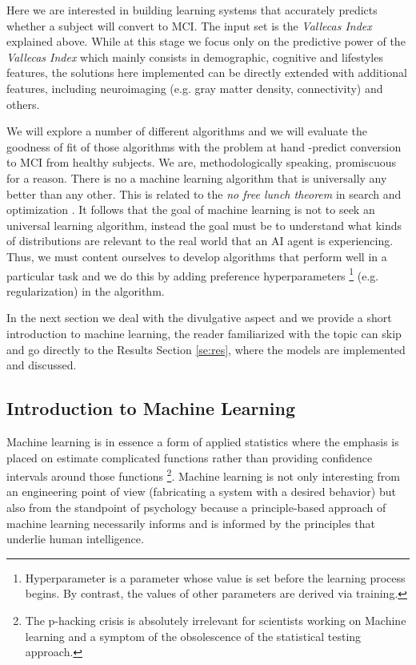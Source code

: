 \documentclass[11pt]{article}
\theoremstyle{definition}
\theoremstyle{remark}
\begin{document}
Here we are interested in building learning systems that accurately predicts whether a subject will convert to MCI. The input set is the \emph{Vallecas Index} explained above. While at this stage we focus only on the predictive power of the \emph{Vallecas Index} which mainly consists in demographic, cognitive and lifestyles features, the solutions here implemented can be directly extended with additional features, including neuroimaging (e.g. gray matter density, connectivity) and others.

We will explore a number of different algorithms and we will evaluate the goodness of fit of those algorithms with the problem at hand -predict conversion to MCI from healthy subjects. We are, methodologically speaking, promiscuous for a reason. There is no a machine learning algorithm that is universally any better than any other. This is related to the \emph{no free lunch theorem} in search and optimization \cite{wolpert1997no}. It follows that the goal of machine learning is not to seek an universal learning algorithm, instead the goal must be to understand what kinds of distributions are relevant to the real world that an AI agent is experiencing. Thus, we must content ourselves to develop algorithms that perform well in a particular task and we do this by adding preference hyperparameters \footnote{Hyperparameter is a parameter whose value is set before the learning process begins. By contrast, the values of other parameters are derived via training.} (e.g. regularization) in the algorithm.  

In the next section we deal with the divulgative aspect and we provide a short introduction to machine learning, the reader familiarized with the topic can skip and go directly to the Results Section \ref{se:res}, where the models are implemented and discussed. 

\subsection{Introduction to Machine Learning} 
\label{sse:iml}
Machine learning is in essence a form of applied statistics where the emphasis is placed on estimate complicated functions rather than providing confidence intervals around those functions \footnote{The p-hacking crisis is absolutely irrelevant for scientists working on Machine learning and a symptom of the obsolescence of the statistical testing approach.}. Machine learning is not only interesting from an engineering point of view (fabricating a system with a desired behavior) but also from the standpoint of psychology because a principle-based approach of machine learning necessarily informs and is informed by the principles that underlie human intelligence.
\end{document}
